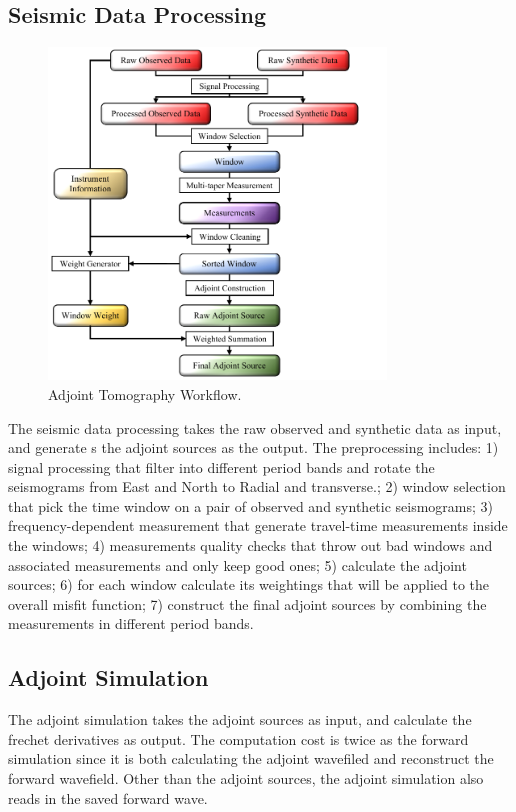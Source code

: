 \documentclass[extra,mreferee]{gji}
\begin{document}
\subsection{Seismic Data Processing}

\begin{figure}
  \centering
  \includegraphics[width=0.8\textwidth]{figures/Preprocess_workflow.pdf}
  \caption{Adjoint Tomography Workflow.}
  \label{fig:phase_hist}
\end{figure}

The seismic data processing takes the raw observed and synthetic data as input, and generate s the adjoint sources as the output. The preprocessing includes: 1) signal processing that  filter into different period bands and rotate the seismograms from East and North to Radial and transverse.; 2) window selection that pick the time window on a pair of observed and synthetic seismograms; 3) frequency-dependent measurement that generate travel-time measurements inside the windows; 4) measurements quality checks that throw out bad windows and associated measurements and only keep good ones; 5) calculate the adjoint sources; 6) for each window calculate its weightings that will be applied to the overall misfit function; 7) construct the final adjoint sources by combining the measurements in different period bands.

\subsection{Adjoint Simulation}
The adjoint simulation takes the adjoint sources as input, and calculate the frechet derivatives as output. The computation cost is twice as the forward simulation since it is both calculating the adjoint wavefiled and reconstruct the forward wavefield. Other than the adjoint sources, the adjoint simulation also reads in the saved forward wave.
\end{document}
